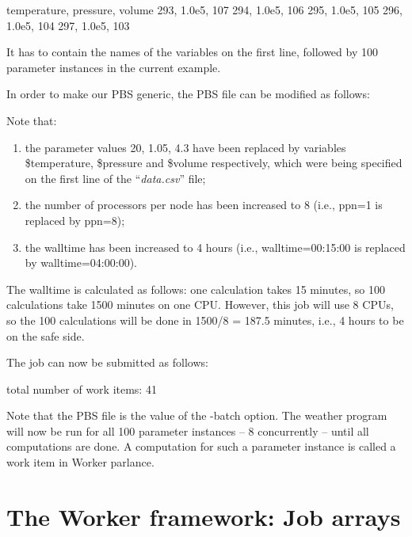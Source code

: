\begin{prompt}
temperature, pressure, volume
293, 1.0e5, 107
294, 1.0e5, 106
295, 1.0e5, 105
296, 1.0e5, 104
297, 1.0e5, 103
\end{prompt}

It has to contain the names of the variables on the first line, followed by 100
parameter instances in the current example.

In order to make our PBS generic, the PBS file can be modified as follows:


Note that:

\begin{enumerate}
  \item  the parameter values 20, 1.05, 4.3 have been replaced by variables
    \$temperature, \$pressure and \$volume respectively, which were being specified
    on the first line of the ``\emph{data.csv}'' file;
  \item  the number of processors per node has been increased to 8 (i.e., ppn=1 is replaced by
    ppn=8);
  \item  the walltime has been increased to 4 hours (i.e.,
    walltime=00:15:00 is replaced by walltime=04:00:00).
\end{enumerate}

The walltime is calculated as follows: one calculation takes 15 minutes, so 100
calculations take 1500 minutes on one CPU. However, this job will use 8 CPUs,
so the 100 calculations will be done in 1500/8 = 187.5 minutes, i.e., 4 hours
to be on the safe side.

The job can now be submitted as follows:

\begin{prompt}
total number of work items: 41
\end{prompt}

Note that the PBS file is the value of the -batch option. The weather program
will now be run for all 100 parameter instances -- 8 concurrently -- until
all computations are done. A computation for such a parameter instance is
called a work item in Worker parlance.

\section{The Worker framework: Job arrays}

